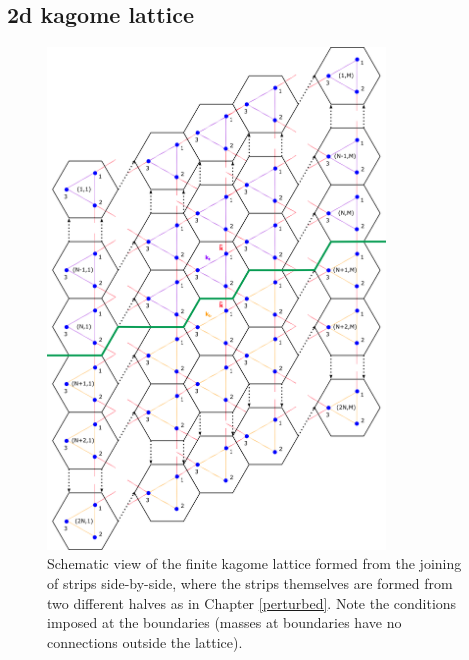 \subsection{2d kagome lattice}
\begin{figure}[!h]
\centering
\includegraphics[width=0.8\textwidth]{imgs/kagomefinitemodel.png}
\caption{\label{fig:kagomeM} Schematic view of the finite kagome lattice formed
  from the joining of strips side-by-side, where the strips themselves are
  formed from two different halves as in Chapter \ref{perturbed}. Note the
  conditions imposed at the boundaries (masses at boundaries have no
  connections outside the lattice).}
\end{figure}


